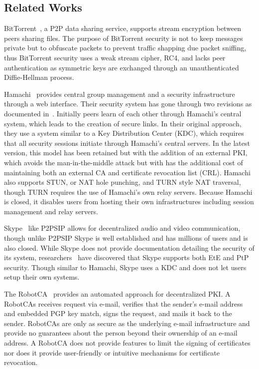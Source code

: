 \documentclass[conference]{IEEEtran}
\begin{document}
\subsection{Related Works}
BitTorrent~\cite{bittorrent_security}, a P2P data sharing service,  supports
stream encryption between peers sharing files.  The purpose of BitTorrent
security is not to keep messages private but to obfuscate packets to
prevent traffic shapping due packet sniffing, thus BitTorrent security uses a
weak stream cipher, RC4, and lacks peer authentication as symmetric keys are
exchanged through an unauthenticated Diffie-Hellman process.

Hamachi~\cite{hamachi} provides central group management and a security
infrastructure through a web interface.  Their security system has gone through
two revisions as documented in~\cite{hamachi_security}.  Initially peers learn
of each other through Hamachi's central system, which leads to the creation of
secure links.  In their original approach, they use a system similar to a Key
Distribution Center (KDC), which requires that all security sessions initiate
through Hamachi's central servers.  In the latest version, this model has been
retained but with the addition of an external PKI, which avoids the
man-in-the-middle attack but with has the additional cost of maintaining both
an external CA and certificate revocation list (CRL).  Hamachi also supports
STUN, or NAT hole punching, and TURN style NAT traversal, though TURN requires the use of
Hamachi's own relay servers.  Because Hamachi is closed, it disables users from
hosting their own infrastructures including session management and relay
servers.

Skype~\cite{skype} like P2PSIP allows for decentralized audio and video
communication, though unlike P2PSIP Skype is well established and has millions
of users and is also closed.  While Skype does not provide documentation
detailing the security of its system, researchers~\cite{skype_auth,
skype_overview} have discovered that Skype supports both EtE and PtP security.
Though similar to Hamachi, Skype uses a KDC and does not let users setup their
own systems.

The RobotCA~\cite{robotca} provides an automated approach for decentralized
PKI.  A RobotCAs receives request via e-mail, verifies that the sender's e-mail
address and embedded PGP key match, signs the request, and mails it back to the
sender.  RobotCAs are only as secure as the underlying e-mail infrastructure
and provide no guarantees about the person beyond their ownership of an e-mail
address.  A RobotCA does not provide features to limit the signing of
certificates nor does it provide user-friendly or intuitive mechanisms for
certificate revocation.
\end{document}
